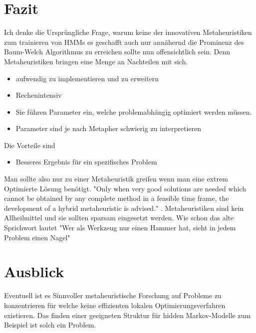 \section*{Fazit}
Ich denke die Ursprüngliche Frage, warum keine der innovativen Metaheuristiken zum trainieren von HMMs es geschafft auch nur annähernd die Prominenz des Baum-Welch Algorithmus zu erreichen sollte nun offensichtlich sein. Denn Metaheuristiken bringen eine Menge an Nachteilen mit sich.
\begin{itemize}
    \item aufwendig zu implementieren und zu erweitern
    \item Rechenintensiv
    \item Sie führen Parameter ein, welche problemabhängig optimiert werden müssen.
    \item Parameter sind je nach Metapher schwierig zu interpretieren
\end{itemize}

Die Vorteile sind
\begin{itemize}
    \item Besseres Ergebnis für ein spezifisches Problem
\end{itemize}

Man sollte also nur zu einer Metaheuristik greifen wenn man eine extrem Optimierte Lösung benötigt.
"Only when very good solutions are needed which cannot be obtained by any complete method in a feasible time frame, the development of a hybrid metaheuristic is advised." \cite*{MetaheuristicsSurvey}.
Metaheuristiken sind kein Allheilmittel und sie sollten sparsam eingesetzt werden. Wie schon das alte Sprichwort lautet "Wer als Werkzeug nur einen Hammer hat, sieht in jedem Problem einen Nagel" 

\section*{Ausblick}
Eventuell ist es Sinnvoller metaheuristische Forschung auf Probleme zu konzentrieren für welche keine effizienten lokalen Optimierungsverfahren existieren. Das finden einer geeigneten Struktur für hidden Markov-Modelle zum Beispiel ist solch ein Problem.